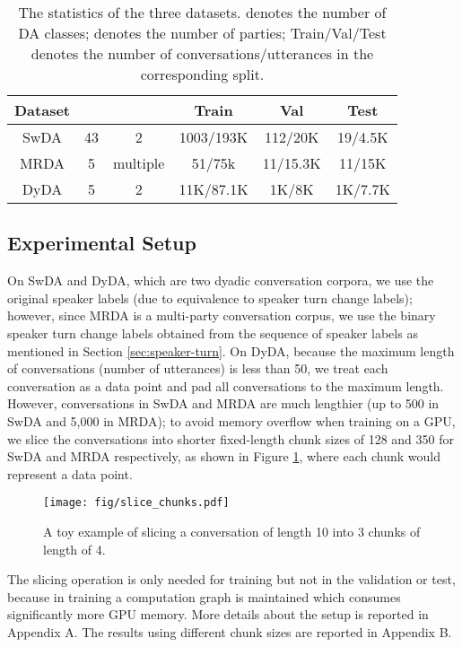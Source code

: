 \documentclass[11pt]{article}
\begin{document}
\begin{table}[ht]
\centering
\begin{small}
\addtolength{\tabcolsep}{-3pt}
\begin{tabular}{cccccc}
\hline
Dataset &  &    & Train     & Val      & Test    \\ \hline
SwDA    & 43  & 2     & 1003/193K & 112/20K  & 19/4.5K \\
MRDA    & 5   & multiple & 51/75k    & 11/15.3K & 11/15K  \\
DyDA    & 5   & 2     & 11K/87.1K & 1K/8K    & 1K/7.7K \\ \hline
\end{tabular}
\addtolength{\tabcolsep}{3pt}
\end{small}
\caption{The statistics of the three datasets.  denotes the number of DA classes;  denotes the number of parties; Train/Val/Test denotes the number of conversations/utterances in the corresponding split.}
\label{tab:datasets}
\end{table}

\subsection{Experimental Setup}
On SwDA and DyDA, which are two dyadic conversation corpora, we use the original speaker labels (due to equivalence to speaker turn change labels); however, since MRDA is a multi-party conversation corpus, we use the binary speaker turn change labels obtained from the sequence of speaker labels as mentioned in Section \ref{sec:speaker-turn}. 
On DyDA, because the maximum length of conversations (number of utterances) is less than 50, we treat each conversation as a data point and pad all conversations to the maximum length. However, conversations in SwDA and MRDA are much lengthier (up to 500 in SwDA and 5,000 in MRDA); to avoid memory overflow when training on a GPU, we slice the conversations into shorter fixed-length chunk sizes of 128 and 350 for SwDA and MRDA respectively, as shown in Figure \ref{fig:chunks}, where each chunk would represent a data point. 
\begin{figure}[ht]
    \centering
    \texttt{[image: fig/slice\_chunks.pdf]}
    \caption{A toy example of slicing a conversation of length 10 into 3 chunks of length of 4.}
    \label{fig:chunks}
\end{figure}
The slicing operation is only needed for training but not in the validation or test, because in training a computation graph is maintained which consumes significantly more GPU memory.
More details about the setup is reported in Appendix A. The results using different chunk sizes are reported in Appendix B.
\end{document}
